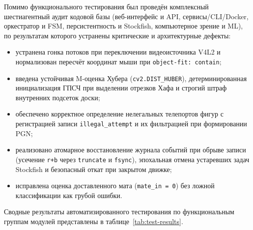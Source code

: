 Помимо функционального тестирования был проведён комплексный шестиагентный аудит кодовой базы (веб-интерфейс и API, сервисы/CLI/Docker, оркестратор и FSM, персистентность и Stockfish, компьютерное зрение и ML), по результатам которого устранены критические и архитектурные дефекты:
\begin{itemize}
    \item устранена гонка потоков при переключении видеоисточника V4L2 и нормализован пересчёт координат мыши при \texttt{object-fit: contain};
    \item введена устойчивая M-оценка Хубера (\texttt{cv2.DIST\_HUBER}), детерминированная инициализация ГПСЧ при выделении отрезков Хафа и строгий штраф внутренних подсеток доски;
    \item обеспечено корректное определение нелегальных телепортов фигур с регистрацией записи \texttt{illegal\_attempt} и их фильтрацией при формировании PGN;
    \item реализовано атомарное восстановление журнала событий при обрыве записи (усечение \texttt{r+b} через \texttt{truncate} и \texttt{fsync}), эпохальная отмена устаревших задач Stockfish и безопасный откат при закрытом движке;
    \item исправлена оценка доставленного мата (\texttt{mate\_in = 0}) без ложной классификации как грубой ошибки.
\end{itemize}

Сводные результаты автоматизированного тестирования по функциональным группам модулей представлены в таблице~\ref{tab:test-results}.

